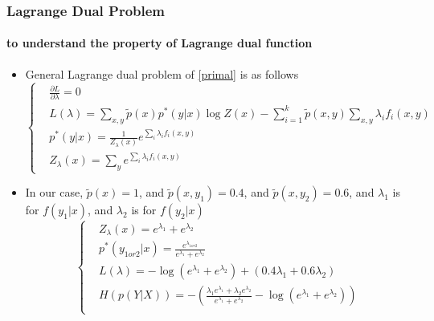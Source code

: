 \begin{frame}
	\frametitle{Lagrange Dual Problem}
	\framesubtitle{to understand the property of Lagrange dual function}
	\begin{scriptsize}
	\begin{itemize}	
		\item General Lagrange dual problem of \ref{primal} is as follows
		\begin{equation}
			\left\{
				\begin{aligned}
					&\frac{\partial{L}}{\partial{\lambda}}=0\\
					&L(\lambda)=\sum_{x,y}\widetilde{p}(x)p^*(y|x)\log Z(x)-\sum_{i=1}^k\widetilde{p}(x,y)\sum_{x,y}\lambda_if_i(x,y)\\
					&p^*(y|x)=\frac{1}{Z_\lambda(x)}e^{\sum_i\lambda_if_i(x,y)}\\
					&Z_\lambda(x)=\sum_ye^{\sum_i\lambda_if_i(x,y)}
				\end{aligned}
			\right.
		\end{equation}
		\item In our case, $\widetilde{p}(x)=1$, and $\widetilde{p}(x,y_1)=0.4$, and $\widetilde{p}(x,y_2)=0.6$, and $\lambda_1$ is for $f(y_1|x)$, and $\lambda_2$ is for $f(y_2|x)$
		\begin{equation}\label{sample}
			\left\{
				\begin{aligned}
					&Z_\lambda(x)=e^{\lambda_1}+e^{\lambda_2}\\
					&p^*(y_{1 or 2}|x)=\frac{e^{\lambda_{1 or 2}}}{e^{\lambda_1}+e^{\lambda_2}}\\
					&L(\lambda)=-\log(e^{\lambda_1}+e^{\lambda_2})+(0.4\lambda_1+0.6\lambda_2)\\
					&H(p(Y|X))=-(\frac{\lambda_{1}e^{\lambda_{1}}+\lambda_{2}e^{\lambda_{2}}}{e^{\lambda_1}+e^{\lambda_2}}-\log(e^{\lambda_1}+e^{\lambda_2}))\\
				\end{aligned}
			\right.
		\end{equation}
	\end{itemize}
	\end{scriptsize}
\end{frame}

